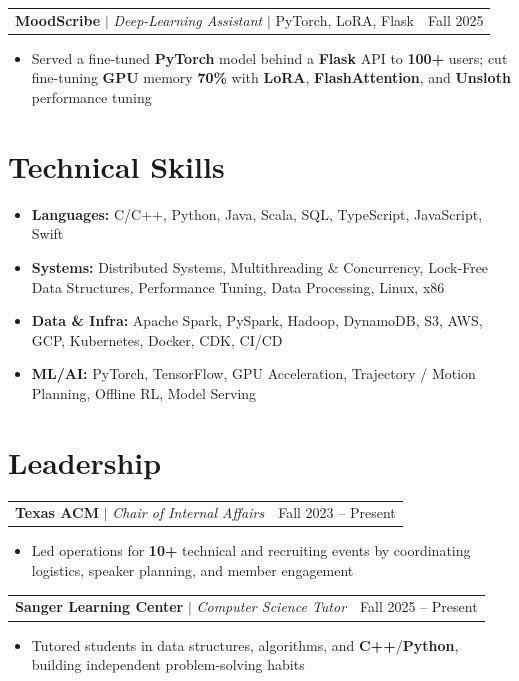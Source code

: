 \documentclass[letterpaper,10pt]{article}
\makeatletter
\newcommand{\resumeWorkHeading}[2]{%
  \vspace{2pt}\noindent
  \begin{tabular*}{\textwidth}{@{}l@{\extracolsep{\fill}}r@{}}
    #1 & #2 \\
  \end{tabular*}%
  \vspace{-2pt}
}
\newcommand{\resumeItemListStart}{\begin{itemize}}
\newcommand{\resumeItemListEnd}{\end{itemize}\vspace{3pt}}
\newcommand{\resumeItem}[1]{\item #1}
\makeatother
\begin{document}
\resumeWorkHeading
{\textbf{MoodScribe} $|$ \emph{Deep-Learning Assistant} $|$ PyTorch, LoRA, Flask}{Fall 2025}
\resumeItemListStart
\resumeItem{Served a fine-tuned \textbf{PyTorch} model behind a \textbf{Flask} API to \textbf{100+} users; cut fine-tuning \textbf{GPU} memory \textbf{70\%} with \textbf{LoRA}, \textbf{FlashAttention}, and \textbf{Unsloth} performance tuning}
\resumeItemListEnd

\section{Technical Skills}
\begin{itemize}[leftmargin=0em,label={},itemsep=1pt,parsep=0pt,topsep=2pt]
\item \textbf{Languages:} C/C++, Python, Java, Scala, SQL, TypeScript, JavaScript, Swift
\item \textbf{Systems:} Distributed Systems, Multithreading \& Concurrency, Lock-Free Data Structures, Performance Tuning, Data Processing, Linux, x86
\item \textbf{Data \& Infra:} Apache Spark, PySpark, Hadoop, DynamoDB, S3, AWS, GCP, Kubernetes, Docker, CDK, CI/CD
\item \textbf{ML/AI:} PyTorch, TensorFlow, GPU Acceleration, Trajectory / Motion Planning, Offline RL, Model Serving
\end{itemize}

\section{Leadership}
\resumeWorkHeading
{\textbf{Texas ACM} $|$ \emph{Chair of Internal Affairs}}{Fall 2023 -- Present}
\resumeItemListStart
\resumeItem{Led operations for \textbf{10+} technical and recruiting events by coordinating logistics, speaker planning, and member engagement}
\resumeItemListEnd

\resumeWorkHeading
{\textbf{Sanger Learning Center} $|$ \emph{Computer Science Tutor}}{Fall 2025 -- Present}
\resumeItemListStart
\resumeItem{Tutored students in data structures, algorithms, and \textbf{C++}/\textbf{Python}, building independent problem-solving habits}
\resumeItemListEnd
\end{document}
